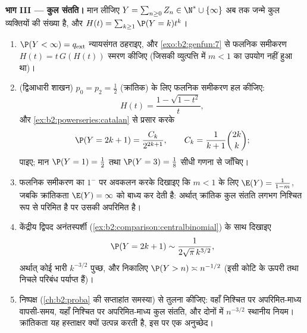 \begin{problem}
\medskip
\noindent\textbf{भाग III --- कुल संतति।} मान लीजिए $Y =
\sum_{n\geq0}Z_n \in \N^* \cup \{\infty\}$ अब तक जन्मे
कुल व्यक्तियों की संख्या है, और $H(t) =
\sum_{k\geq1}\P(Y = k)t^k$।
\begin{enumerate}[resume]
  \item $\P(Y < \infty) = q_{\mathrm{ext}}$ न्यायसंगत ठहराइए, और \cref{exo:b2:genfun:7} से फलनिक समीकरण $H(t) = t\,G(H(t))$
        स्मरण कीजिए (जिसकी व्युत्पत्ति में $m < 1$ का उपयोग नहीं
        हुआ था)।
  \item (द्विआधारी शाखन) $p_0 = p_2 = \frac12$ (क्रांतिक) के लिए फलनिक समीकरण हल
        कीजिए:
        \[
        H(t) = \frac{1 - \sqrt{1 - t^2}}{t},
        \]
        और \cref{ex:b2:powerseries:catalan} से प्रसार करके
        \[
        \P(Y = 2k + 1) = \frac{C_k}{2^{2k+1}},
        \qquad C_k = \frac1{k+1}\binom{2k}k ;
        \]
        पाइए; मान $\P(Y = 1) = \frac12$ तथा $\P(Y = 3)
        = \frac18$ सीधी गणना से जाँचिए।
  \item फलनिक समीकरण का $1^-$ पर अवकलन करके दिखाइए कि $m < 1$ के
        लिए $\E(Y) = \frac{1}{1-m}$, जबकि क्रांतिकता $\E(Y) = \infty$ को बाध्य कर देती है:
        अर्थात् क्रांतिक कुल संतति लगभग निश्चित रूप से परिमित
        है पर उसकी  अपरिमित है।
  \item केंद्रीय द्विपद अनंतस्पर्शी (\cref{ex:b2:comparison:centralbinomial}) के साथ दिखाइए
        \[
        \P(Y = 2k+1) \sim \frac{1}{2\sqrt\pi\,k^{3/2}},
        \]
        अर्थात् कोई भारी $k^{-3/2}$ पुच्छ, और निकालिए $\P(Y > n)
        \asymp n^{-1/2}$ (इसी कोटि
        के ऊपरी तथा निचले परिबंध पर्याप्त हैं)।
  \item निष्पक्ष  (\cref{ch:b2:proba} की सप्ताहांत समस्या)
        से तुलना कीजिए: वहाँ निश्चित पर अपरिमित-माध्य वापसी-समय,
        यहाँ निश्चित पर अपरिमित-माध्य कुल संतति, और दोनों में
        $n^{-3/2}$ स्थानीय नियम। क्रांतिकता यह हस्ताक्षर क्यों उत्पन्न
        करती है, इस पर एक अनुच्छेद।
\end{enumerate}


\end{problem}
